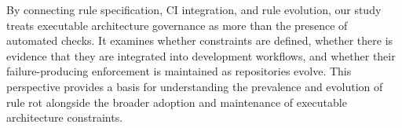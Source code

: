 By connecting rule specification, CI integration, and rule
evolution, our study treats executable architecture governance
as more than the presence of automated checks. It examines
whether constraints are defined, whether there is evidence
that they are integrated into development workflows, and
whether their failure-producing enforcement is maintained
as repositories evolve. This perspective provides a basis
for understanding the prevalence and evolution of rule rot
alongside the broader adoption and maintenance of executable
architecture constraints.